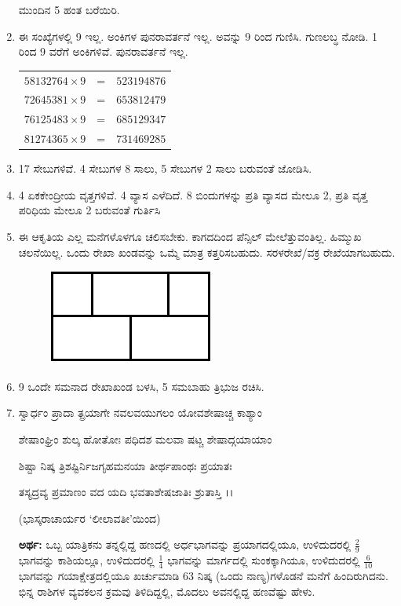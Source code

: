 \begin{enumerate}
\smallskip
ಮುಂದಿನ 5 ಹಂತ ಬರೆಯಿರಿ. 

\item ಈ ಸಂಖ್ಯೆಗಳಲ್ಲಿ 9 ಇಲ್ಲ. ಅಂಕಿಗಳ ಪುನರಾವರ್ತನೆ ಇಲ್ಲ. ಅವನ್ನು 9 ರಿಂದ ಗುಣಿಸಿ. ಗುಣಲಬ್ಧ ನೋಡಿ. 1 ರಿಂದ 9 ವರೆಗೆ ಅಂಕಿಗಳಿವೆ. ಪುನರಾವರ್ತನೆ ಇಲ್ಲ. 

\begin{tabular}[t]{lcl}
$58132764\times 9$ & = & $523194876$\\
$72645381\times 9$ & = & $653812479$\\
$76125483\times 9$ & = & $685129347$\\
$81274365\times 9$ & = & $731469285$
\end{tabular}

\item 17 ಸೇಬುಗಳಿವೆ. 4 ಸೇಬುಗಳ 8 ಸಾಲು, 5 ಸೇಬುಗಳ 2 ಸಾಲು ಬರುವಂತೆ ಜೋಡಿಸಿ. 

\item 4 ಏಕಕೇಂದ್ರೀಯ ವೃತ್ತಗಳಿವೆ. 4 ವ್ಯಾಸ ಎಳೆದಿದೆ. 8 ಬಿಂದುಗಳನ್ನು ಪ್ರತಿ ವ್ಯಾಸದ ಮೇಲೂ 2, ಪ್ರತಿ ವೃತ್ತ ಪರಿಧಿಯ ಮೇಲೂ 2 ಬರುವಂತೆ ಗುರ್ತಿಸಿ 

\item ಈ ಆಕೃತಿಯ ಎಲ್ಲ ಮನೆಗಳೊಳಗೂ ಚಲಿಸಬೇಕು. ಕಾಗದದಿಂದ ಪೆನ್ಸಿಲ್ ಮೇಲೆತ್ತುವಂತಿಲ್ಲ. ಹಿಮ್ಮುಖ ಚಲನೆಯಿಲ್ಲ. ಒಂದು ರೇಖಾ ಖಂಡವನ್ನು ಒಮ್ಮೆ ಮಾತ್ರ ಕತ್ತರಿಸಬಹುದು. ಸರಳರೇಖೆ/ವಕ್ರ ರೇಖೆಯಾಗಬಹುದು. 

\begin{figure}[H]
\centering
\includegraphics[scale=0.9]{images/chap7/q17.eps}
\end{figure}


\item 9 ಒಂದೇ ಸಮನಾದ ರೇಖಾಖಂಡ ಬಳಸಿ, 5 ಸಮಬಾಹು ತ್ರಿಭುಜ ರಚಿಸಿ. 

\item ಸ್ವಾರ್ಧಂ ಪ್ರಾದಾ ತ್ಪ್ರಯಾಗೇ ನವಲವಯುಗಲಂ ಯೋವಶೇಷಾಚ್ಚ ಕಾಶ್ಯಾಂ 

ಶೇಷಾಂಘ್ರಿಂ ಶುಲ್ಕ ಹೋತೋಃ ಪಧಿದಶ ಮಲವಾ ಷಟ್ಚ ಶೇಷಾದ್ಗಯಾಯಾಂ 

ಶಿಷ್ಟಾ ನಿಷ್ಕ ತ್ರಿಶಷ್ಟಿರ್ನಿಜಗೃಹಮನಯಾ ತೀರ್ಥಪಾಂಥಃ ಪ್ರಯಾತಃ 

ತಸ್ಯದ್ರವ್ಯ ಪ್ರಮಾಣಂ ವದ ಯದಿ ಭವತಾಶೇಷಜಾತಿಃ ಶ್ರುತಾಸ್ತಿ ।।

\smallskip
\hfill (ಭಾಸ್ಕರಾಚಾರ್ಯರ `ಲೀಲಾವತೀ'ಯಿಂದ)

\smallskip
{\bf ಅರ್ಥ:} ಒಬ್ಬ ಯಾತ್ರಿಕನು ತನ್ನಲ್ಲಿದ್ದ ಹಣದಲ್ಲಿ ಅರ್ಧಭಾಗವನ್ನು ಪ್ರಯಾಗದಲ್ಲಿಯೂ, ಉಳಿದುದರಲ್ಲಿ $\frac{2}{9}$ ಭಾಗವನ್ನು ಕಾಶಿಯಲ್ಲೂ, ಉಳಿದುದರಲ್ಲಿ $\frac{1}{4}$ ಭಾಗವನ್ನು ಮಾರ್ಗದಲ್ಲಿ ಸುಂಕಕ್ಕಾಗಿಯೂ, ಉಳಿದುದರಲ್ಲಿ $\frac{6}{10}$ ಭಾಗವನ್ನು ಗಯಾಕ್ಷೇತ್ರದಲ್ಲಿಯೂ ಖರ್ಚುಮಾಡಿ 63 ನಿಷ್ಕ (ಒಂದು ನಾಣ್ಯ)ಗಳೊಡನೆ ಮನೆಗೆ ಹಿಂದಿರುಗಿದನು. ಭಿನ್ನ ರಾಶಿಗಳ ವ್ಯವಕಲನ ಕ್ರಮವು ತಿಳಿದಿದ್ದಲ್ಲಿ, ಮೊದಲು ಅವನಲ್ಲಿದ್ದ ಹಣವೆಷ್ಟು ಹೇಳು.


\end{enumerate}
